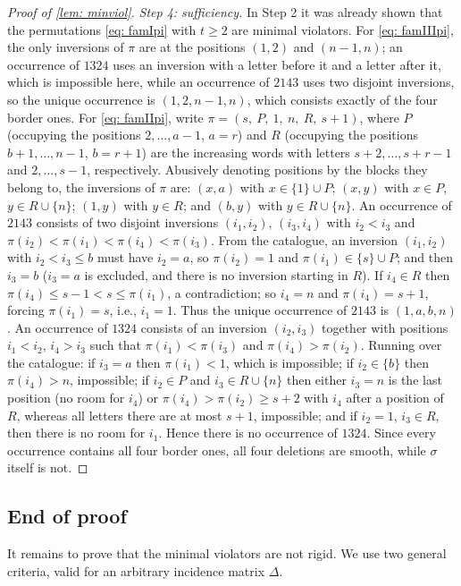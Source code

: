 \documentclass[12pt]{article}
\newcommand{\IM}{\Delta}
\begin{document}
\begin{proof}[Proof of \cref{lem: minviol}]
\emph{Step 4: sufficiency.}
In Step 2 it was already shown that the permutations \cref{eq: famIpi} with $t\ge2$ are minimal violators.
For \cref{eq: famIIIpi}, the only inversions of $\pi$ are at the positions $(1,2)$ and $(n-1,n)$; an occurrence of
$1324$ uses an inversion with a letter before it and a letter after it, which is impossible here, while an occurrence
of $2143$ uses two disjoint inversions, so the unique occurrence is $(1,2,n-1,n)$, which consists exactly of the four
border ones. For \cref{eq: famIIpi}, write $\pi=(s,\ P,\ 1,\ n,\ R,\ s+1)$, where $P$ (occupying the positions $2,\dots,a-1$,
$a=r$) and $R$ (occupying the positions $b+1,\dots,n-1$, $b=r+1$) are the increasing words with letters
$s+2,\dots,s+r-1$ and $2,\dots,s-1$, respectively. Abusively denoting positions by the blocks they belong to,
the inversions of $\pi$ are: $(x,a)$ with $x\in\{1\}\cup P$; $(x,y)$ with $x\in P$, $y\in R\cup\{n\}$;
$(1,y)$ with $y\in R$; and $(b,y)$ with $y\in R\cup\{n\}$.
An occurrence of $2143$ consists of two disjoint inversions $(i_1,i_2)$, $(i_3,i_4)$ with $i_2<i_3$ and
$\pi(i_2)<\pi(i_1)<\pi(i_4)<\pi(i_3)$. From the catalogue, an inversion $(i_1,i_2)$ with $i_2<i_3\le b$ must have
$i_2=a$, so $\pi(i_2)=1$ and $\pi(i_1)\in\{s\}\cup P$; and then $i_3=b$ ($i_3=a$ is excluded, and there is no
inversion starting in $R$). If $i_4\in R$ then $\pi(i_4)\le s-1<s\le\pi(i_1)$, a contradiction; so $i_4=n$ and
$\pi(i_4)=s+1$, forcing $\pi(i_1)=s$, i.e., $i_1=1$. Thus the unique occurrence of $2143$ is $(1,a,b,n)$.
An occurrence of $1324$ consists of an inversion $(i_2,i_3)$ together with positions $i_1<i_2$, $i_4>i_3$ such that
$\pi(i_1)<\pi(i_3)$ and $\pi(i_4)>\pi(i_2)$. Running over the catalogue: if $i_3=a$ then $\pi(i_1)<1$, which is
impossible; if $i_2\in\{b\}$ then $\pi(i_4)>n$, impossible; if $i_2\in P$ and $i_3\in R\cup\{n\}$ then either
$i_3=n$ is the last position (no room for $i_4$) or $\pi(i_4)>\pi(i_2)\ge s+2$ with $i_4$ after a position of $R$,
whereas all letters there are at most $s+1$, impossible; and if $i_2=1$, $i_3\in R$, then there is no room for
$i_1$. Hence there is no occurrence of $1324$. Since every occurrence contains all four border
ones, all four deletions are smooth, while $\sigma$ itself is not.
\end{proof}

\subsection{End of proof}

It remains to prove that the minimal violators are not rigid. We use two general criteria, valid for an arbitrary incidence matrix $\IM$.
\end{document}
